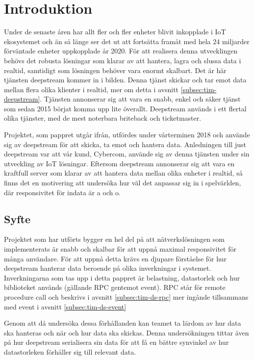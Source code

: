 \section{Introduktion}

Under de senaste åren har allt fler och fler enheter blivit inkopplade i IoT ekosystemet och än så länge ser det ut att fortsätta framåt med hela 24 miljarder förväntade enheter uppkopplade år 2020\cite{IoT-ecosystem}. För att realisera denna utvecklingen behövs det robusta lösningar som klarar av att hantera, lagra och slussa data i realtid, samtidigt som lösningen behöver vara enormt skalbart. Det är här tjänsten deepstream\cite{deepstream} kommer in i bilden. Denna tjänst skickar och tar emot data mellan flera olika klienter i realtid, mer om detta i avsnitt \ref{subsec:tim-deepstream}. Tjänsten annonserar sig att vara en snabb, enkel och säker tjänst som sedan 2015 börjat komma upp lite överallt. Deepstream används i ett flertal olika tjänster, med de mest noterbara briteback och ticketmaster\cite{ds-usecases}.

Projektet, som pappret utgår ifrån, utfördes under vårterminen 2018 och använde sig av deepstream för att skicka, ta emot och hantera data. Anledningen till just deepstream var att vår kund, Cybercom, använde sig av denna tjänsten under sin utveckling av IoT lösningar. Eftersom deepstream annonserar sig att vara en kraftfull server som klarar av att hantera data mellan olika enheter i realtid, så finns det en motivering att undersöka hur väl det anpassar sig in i spelvärlden, där responsivitet för indata är a och o.

\subsection{Syfte}
\label{subsec:tim-aim}
Projektet som har utförts bygger en hel del på att nätverkslösningen som implementerats är snabb och skalbar för att uppnå maximal responsivitet för många användare. För att uppnå detta krävs en djupare förståelse för hur deepstream hanterar data beroende på olika inverkningar i systemet. Inverkningarna som tas upp i detta pappret är belastning, datastorlek och hur biblioteket används (gällande RPC gentemot event). RPC står för remote procedure call och beskrivs i avsnitt \ref{subsec:tim-ds-rpc} mer ingånde tillsammans med event i avsnitt \ref{subsec:tim-ds-event}

Genom att då undersöka dessa förhållanden kan teamet ta lärdom av hur data ska hanteras och när och hur data ska skickas. Denna undersökningen tittar även på hur deepstream serialisera sin data för att få en bättre synvinkel av hur datastorleken förhåller sig till relevant data.

